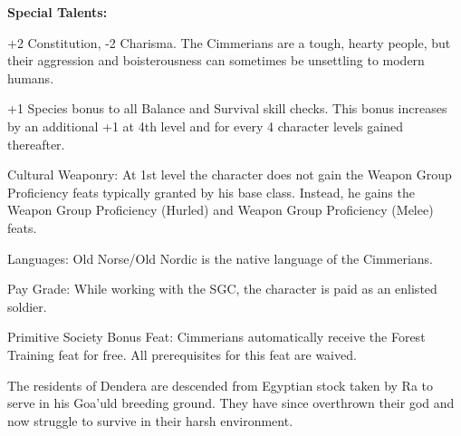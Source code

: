 \textbf{Special Talents:}
\begin{itemize*}
\item +2 Constitution, -2 Charisma. The Cimmerians are a tough, hearty people, but their aggression and boisterousness can sometimes be unsettling to modern humans.
\item +1 Species bonus to all Balance and Survival skill checks. This bonus increases by an additional +1 at 4th level and for every 4 character levels gained thereafter.
\item Cultural Weaponry: At 1st level the character does not gain the Weapon Group Proficiency feats typically granted by his base class. Instead, he gains the Weapon Group Proficiency (Hurled) and Weapon Group Proficiency (Melee) feats.
\item Languages: Old Norse/Old Nordic is the native language of the Cimmerians.
\item Pay Grade: While working with the SGC, the character is paid as an enlisted soldier.
\item Primitive Society Bonus Feat: Cimmerians automatically receive the Forest Training feat for free. All prerequisites for this feat are waived.
\end{itemize*}

The residents of Dendera are descended from Egyptian stock taken by Ra to serve in his Goa'uld breeding ground. They have since overthrown their god and now struggle to survive in their harsh environment.

